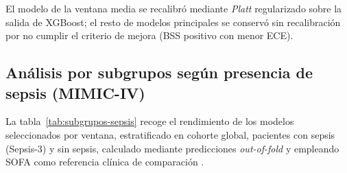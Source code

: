 \documentclass[
  spanish,
  a4paper,
  12pt,
  twoside]{memoir}
\begin{document}
\begin{table}[htbp]
  \centering
  \caption{Hiperparámetros finales de los modelos principales por ventana.}
  \label{tab:hiperparametros-finales}
\end{table}

El modelo de la ventana media se recalibró mediante \emph{Platt} regularizado sobre la salida de XGBoost; el resto de modelos principales se conservó sin recalibración por no cumplir el criterio
de mejora (BSS positivo con menor ECE).

\subsection*{Análisis por subgrupos según presencia de sepsis (MIMIC-IV)}

La tabla~\ref{tab:subgrupos-sepsis} recoge el rendimiento de los modelos seleccionados por ventana, estratificado en cohorte global, pacientes con sepsis (Sepsis-3) y sin sepsis, calculado 
mediante predicciones \textit{out-of-fold} y empleando SOFA como referencia clínica de comparación \cite{singer2016}.
\end{document}
